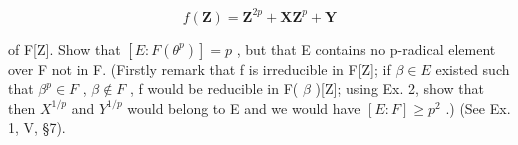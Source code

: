 \[
f (\mathbf {Z}) = \mathbf {Z} ^ {2 p} + \mathbf {X Z} ^ {p} + \mathbf {Y}
\]

of F{[}Z{]}. Show that \([E:F(\theta^{p})]=p\) , but that E contains no p-radical element over F not in F. (Firstly remark that f is irreducible in F{[}Z{]}; if \(\beta\in E\) existed such that \(\beta^{p}\in F\) , \(\beta\notin F\) , f would be reducible in F( \(\beta\) ){[}Z{]}; using Ex. 2, show that then \(X^{1/p}\) and \(Y^{1/p}\) would belong to E and we would have \([E:F]\geqslant p^{2}\) .) (See Ex. 1, V, §7).

